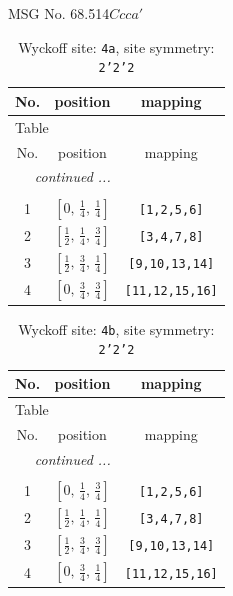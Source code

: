 \documentclass[fleqn,8pt]{jsarticle}
\begin{document}
\setcounter{MaxMatrixCols}{32}

\renewcommand{\tablename}{Table~}
\renewcommand{\figurename}{Figure~}
\begin{center}
\LARGE
MSG No. 68.514\quad$Ccca'$
\end{center}
\renewcommand{\arraystretch}{1.2}
\begin{longtable}{ccc}
\caption{Wyckoff site: {\tt 4a}, site symmetry: {\tt 2'2'2}}
 \\
 \hline \hline
No. & position & mapping \\ \hline \endfirsthead

\multicolumn{2}{l}{\tablename\ \thetable{}} \\
 \hline \hline
No. & position & mapping \\ \hline \endhead

 \hline \hline
\multicolumn{2}{r}{\footnotesize\it continued ...} \\ \endfoot

 \hline \hline
\multicolumn{2}{r}{} \\ \endlastfoot

1 & $\left[ 0,\, \frac{1}{4},\, \frac{1}{4} \right]$ & {\tt [1,2,5,6]} \\ \hline
2 & $\left[ \frac{1}{2},\, \frac{1}{4},\, \frac{3}{4} \right]$ & {\tt [3,4,7,8]} \\ \hline
3 & $\left[ \frac{1}{2},\, \frac{3}{4},\, \frac{1}{4} \right]$ & {\tt [9,10,13,14]} \\ \hline
4 & $\left[ 0,\, \frac{3}{4},\, \frac{3}{4} \right]$ & {\tt [11,12,15,16]} \\
\end{longtable}
\renewcommand{\arraystretch}{1.2}
\begin{longtable}{ccc}
\caption{Wyckoff site: {\tt 4b}, site symmetry: {\tt 2'2'2}}
 \\
 \hline \hline
No. & position & mapping \\ \hline \endfirsthead

\multicolumn{2}{l}{\tablename\ \thetable{}} \\
 \hline \hline
No. & position & mapping \\ \hline \endhead

 \hline \hline
\multicolumn{2}{r}{\footnotesize\it continued ...} \\ \endfoot

 \hline \hline
\multicolumn{2}{r}{} \\ \endlastfoot

1 & $\left[ 0,\, \frac{1}{4},\, \frac{3}{4} \right]$ & {\tt [1,2,5,6]} \\ \hline
2 & $\left[ \frac{1}{2},\, \frac{1}{4},\, \frac{1}{4} \right]$ & {\tt [3,4,7,8]} \\ \hline
3 & $\left[ \frac{1}{2},\, \frac{3}{4},\, \frac{3}{4} \right]$ & {\tt [9,10,13,14]} \\ \hline
4 & $\left[ 0,\, \frac{3}{4},\, \frac{1}{4} \right]$ & {\tt [11,12,15,16]} \\
\end{longtable}
\end{document}
